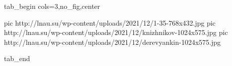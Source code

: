  
 
 
 
 


\ifcmt
  tab_begin cols=3,no_fig,center

     pic http://lnau.su/wp-content/uploads/2021/12/1-35-768x432.jpg
		 pic http://lnau.su/wp-content/uploads/2021/12/knizhnikov-1024x575.jpg
		 pic http://lnau.su/wp-content/uploads/2021/12/derevyankin-1024x575.jpg

  tab_end
\fi
